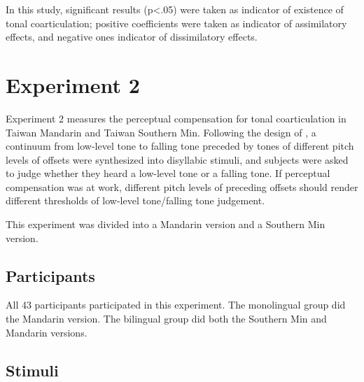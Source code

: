 \documentclass[12pt]{report}
\begin{document}
\begin{CJK}{UTF8}{bsmi}
In this study, significant results (p<.05) were taken as indicator of existence of tonal coarticulation; positive coefficients were taken as indicator of assimilatory effects, and negative ones indicator of dissimilatory effects.

\section{Experiment 2}\label{section:Experiment2}
Experiment 2 measures the perceptual compensation for tonal coarticulation in Taiwan Mandarin and Taiwan Southern Min. Following the design of \cite{Zhangetal2022}, a continuum from low-level tone to falling tone preceded by tones of different pitch levels of offsets were synthesized into disyllabic stimuli, and subjects were asked to judge whether they heard a low-level tone or a falling tone. If perceptual compensation was at work, different pitch levels of preceding offsets should render different thresholds of low-level tone/falling tone judgement.

This experiment was divided into a Mandarin version and a Southern Min version.

\subsection{Participants}
All 43 participants participated in this experiment. The monolingual group did the Mandarin version. The bilingual group did both the Southern Min and Mandarin versions.

\subsection{Stimuli}

\end{CJK}
\end{document}
